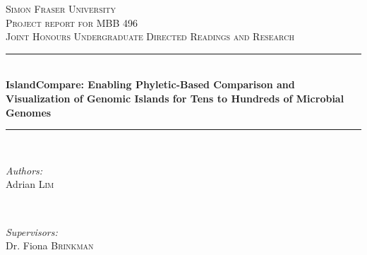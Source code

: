 	\begin{titlepage}

		\newcommand{\HRule}{\rule{\linewidth}{0.5mm}} %

		\center %


		\textsc{\LARGE Simon Fraser University}\\[1.5cm] %
		\textsc{\Large Project report for MBB 496}\\[0.5cm] %
		\textsc{\large Joint Honours Undergraduate Directed Readings and Research}\\[0.5cm] %


		\HRule \\[0.4cm]
		{ \bfseries IslandCompare: Enabling Phyletic-Based Comparison and Visualization of Genomic Islands for Tens to Hundreds of Microbial Genomes}\\[0.4cm] %
		\HRule \\[1.5cm]


		\begin{minipage}{0.4\textwidth}
			\begin{flushleft} \large
				\emph{Authors:}\\
				Adrian \textsc{Lim} \\
			\end{flushleft}
		\end{minipage}
		~
		\begin{minipage}{0.4\textwidth}
			\begin{flushright} \large
				\emph{Supervisors:} \\
				Dr. Fiona \textsc{Brinkman} %


\end{flushright}
\end{minipage}
\end{titlepage}

